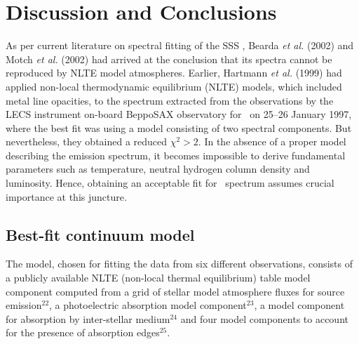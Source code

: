 \section{Discussion and Conclusions}
	As per current literature on spectral fitting of the SSS \source, Bearda \textit{et al.} (2002) and Motch \textit{et al.} (2002) had arrived at the conclusion that its spectra cannot be reproduced by NLTE model atmospheres. %
	Earlier, Hartmann \textit{et al.} (1999) had applied non-local thermodynamic equilibrium (NLTE) models, which included metal line opacities, to the spectrum extracted from the observations by the LECS instrument on-board BeppoSAX observatory for \source\ on 25--26 January 1997, %
	where the best fit was using a model consisting of two spectral components. But nevertheless, they obtained a reduced $\chi^2>2$. In the absence of a proper model describing the emission spectrum, it becomes impossible to derive fundamental parameters such as temperature, neutral hydrogen column density and luminosity. %
	Hence, obtaining an acceptable fit for \source\ spectrum assumes crucial importance at this juncture.
%			
	
	\subsection{Best-fit continuum model}
	The model, chosen for fitting the data from six different observations, consists of a publicly available NLTE (non-local thermal equilibrium) table model component computed from a grid of stellar model atmosphere fluxes for source emission$^{22}$, a photoelectric absorption model component$^{23}$, a model component for absorption by inter-stellar medium$^{24}$ and four model components to account for the presence of absorption edges$^{25}$.
	
